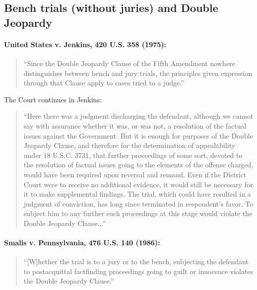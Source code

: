 \documentclass[12pt]{article}
\begin{document}
\subsection{Bench trials (without juries) and Double Jeopardy}



\paragraph{United States v. Jenkins, 420 U.S. 358 (1975):}

\begin{quote}
``Since the Double Jeopardy Clause of the Fifth Amendment nowhere distinguishes between bench and jury trials, the principles given expression through that Clause apply to cases tried to a judge.''
\end{quote}
The Court continues in Jenkins:

\begin{quote}
``Here there was a judgment discharging the defendant, although we cannot say with assurance whether it was, or was not, a resolution of the factual issues against the Government. But it is enough for purposes of the Double Jeopardy Clause, and therefore for the determination of appealability under 18 U.S.C. 3731, that further proceedings of some sort, devoted to the resolution of factual issues going to the elements of the offense charged, would have been required upon reversal and remand. Even if the District Court were to receive no additional evidence, it would still be necessary for it to make supplemental findings. The trial, which could have resulted in a judgment of conviction, has long since terminated in respondent's favor. To subject him to any further such proceedings at this stage would violate the Double Jeopardy Clause...''
\end{quote}



\paragraph{Smalis v. Pennsylvania, 476 U.S. 140 (1986):}

\begin{quote}
``[W]hether the trial is to a jury or to the bench, subjecting the defendant to postacquittal factfinding proceedings going to guilt or innocence violates the Double Jeopardy Clause.''
\end{quote}
\end{document}
